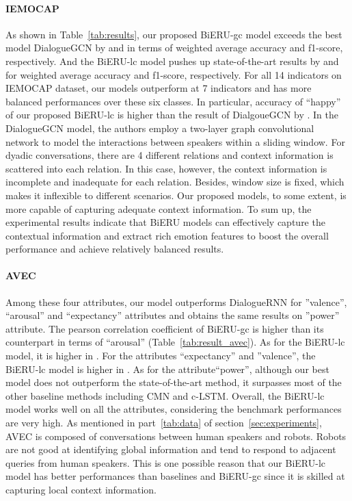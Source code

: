 \documentclass[journal]{IEEEtran}
\begin{document}
\paragraph{IEMOCAP}
As shown in Table~\ref{tab:results}, our proposed BiERU-gc model exceeds the best model DialogueGCN by  and  in terms of weighted average accuracy and f1-score, respectively. And the BiERU-lc model pushes up state-of-the-art results by  and  for weighted average accuracy and f1-score, respectively. For all 14 indicators on IEMOCAP dataset, our models outperform at 7 indicators and has more balanced performances over these six classes. In particular, accuracy of ``happy'' of our proposed BiERU-lc is higher than the result of DialgoueGCN by . In the DialogueGCN model, the authors employ a two-layer graph convolutional network to model the interactions between speakers within a sliding window. For dyadic conversations, there are 4 different relations and context information is scattered into each relation. In this case, however, the context information is incomplete and inadequate for each relation. Besides, window size is fixed, which makes it inflexible to different scenarios. Our proposed models, to some extent, is more capable of capturing adequate context information. To sum up, the experimental results indicate that BiERU models can effectively capture the contextual information and extract rich emotion features to boost the overall performance and achieve relatively balanced results. 



\paragraph{AVEC}
Among these four attributes, our model outperforms DialogueRNN for ''valence'', ``arousal'' and ``expectancy'' attributes and obtains the same results on ''power'' attribute. The pearson correlation coefficient  of BiERU-gc is  higher than its counterpart in terms of ``arousal'' (Table~\ref{tab:result_avec}). As for the BiERU-lc model, it is  higher in . For the attributes ``expectancy'' and ''valence'', the BiERU-lc model is  higher in . As for the attribute``power'', although our best model does not outperform the state-of-the-art method, it surpasses most of the other baseline methods including CMN and c-LSTM.
Overall, the BiERU-lc model works well on all the attributes, considering the benchmark performances are very high.  As mentioned in part~\ref{tab:data} of section~\ref{sec:experiments}, AVEC is composed of conversations between human speakers and robots. Robots are not good at identifying global information and tend to respond to adjacent queries from human speakers. This is one possible reason that our BiERU-lc model has better performances than baselines and BiERU-gc since it is skilled at capturing local context information.
\end{document}
